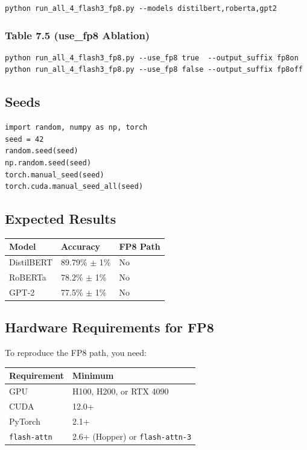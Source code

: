 \begin{lstlisting}
python run_all_4_flash3_fp8.py --models distilbert,roberta,gpt2
\end{lstlisting}

\subsubsection{Table 7.5 (use\_fp8 Ablation)}

\begin{lstlisting}
python run_all_4_flash3_fp8.py --use_fp8 true  --output_suffix fp8on
python run_all_4_flash3_fp8.py --use_fp8 false --output_suffix fp8off
\end{lstlisting}

\subsection{Seeds}

\begin{lstlisting}
import random, numpy as np, torch
seed = 42
random.seed(seed)
np.random.seed(seed)
torch.manual_seed(seed)
torch.cuda.manual_seed_all(seed)
\end{lstlisting}

\subsection{Expected Results}

\begin{table}[H]
\centering
\small
\begin{tabular}{lll}
\toprule
\textbf{Model} & \textbf{Accuracy} & \textbf{FP8 Path} \\
\midrule
DistilBERT & 89.79\% $\pm$ 1\% & No \\
RoBERTa & 78.2\% $\pm$ 1\% & No \\
GPT-2 & 77.5\% $\pm$ 1\% & No \\
\bottomrule
\end{tabular}
\end{table}

\subsection{Hardware Requirements for FP8}

To reproduce the FP8 path, you need:

\begin{table}[H]
\centering
\small
\begin{tabular}{ll}
\toprule
\textbf{Requirement} & \textbf{Minimum} \\
\midrule
GPU & H100, H200, or RTX 4090 \\
CUDA & 12.0+ \\
PyTorch & 2.1+ \\
\texttt{flash-attn} & 2.6+ (Hopper) or \texttt{flash-attn-3} \\
\bottomrule
\end{tabular}
\end{table}

